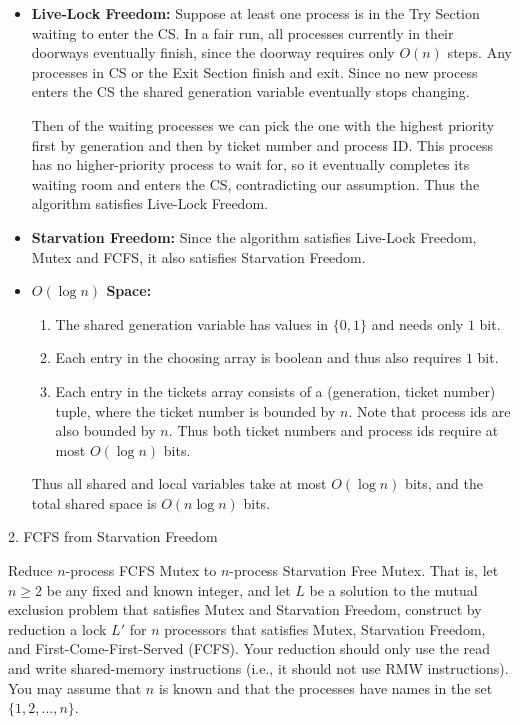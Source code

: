\documentclass[12pt]{article}
\begin{document}
\begin{solution}
\begin{itemize}
    \item \textbf{Live-Lock Freedom:} Suppose at least one process is in the Try Section waiting to enter the CS. In a fair run, all processes currently in their doorways eventually finish, since the doorway requires only \(O(n)\) steps. Any processes in CS or the Exit Section finish and exit. Since no new process enters the CS the shared generation variable eventually stops changing. 
    
    Then of the waiting processes we can pick the one with the highest priority first by generation and then by ticket number and process ID. This process has no higher-priority process to wait for, so it eventually completes its waiting room and enters the CS, contradicting our assumption.
    Thus the algorithm satisfies Live-Lock Freedom. 

    \item \textbf{Starvation Freedom:} Since the algorithm satisfies Live-Lock Freedom, Mutex and FCFS, it also satisfies Starvation Freedom.
    
    \item \textbf{$O(\log n)$ Space:} 
    \begin{enumerate}
        \item The shared generation variable has values in $\{0, 1\}$ and needs only $1$ bit. 
        \item Each entry in the choosing array is boolean and thus also requires $1$ bit. 
        \item Each entry in the tickets array consists of a (generation, ticket number) tuple, where the ticket number is bounded by $n$. Note that process ids are also bounded by $n$. Thus both ticket numbers and process ids require at most $O(\log n)$ bits. 
    \end{enumerate}
    Thus all shared and local variables take at most $O(\log n)$ bits, and the total shared space is $O(n \log n)$ bits. 
\end{itemize}

\end{solution}

\newpage

\begin{problem}{2. FCFS from Starvation Freedom }
        
    Reduce $n$-process FCFS Mutex to $n$-process Starvation Free Mutex. That is, let $n \geq 2$ be any fixed and known integer, and let $L$ be a solution to the mutual exclusion problem that satisfies Mutex and Starvation Freedom, construct by reduction a lock $L'$ for $n$ processors that satisfies Mutex, Starvation Freedom, and First-Come-First-Served (FCFS). Your reduction should only use the read and write shared-memory instructions (i.e., it should not use RMW instructions). You may assume that $n$ is known and that the processes have names in the set $\{1, 2, \ldots, n\}$.
\end{problem}
\end{document}
